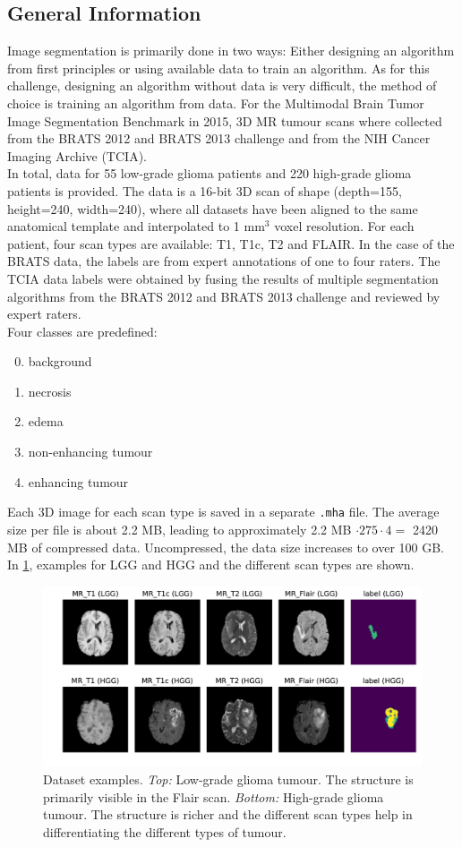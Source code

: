 \documentclass[final]{article}
\begin{document}
\subsection{General Information}
Image segmentation is primarily done in two ways: Either designing an algorithm
from first principles or using available data to train an algorithm. As for
this challenge, designing an algorithm without data is very difficult, the
method of choice is training an algorithm from data. For the Multimodal Brain
Tumor Image Segmentation Benchmark \citep{BRATS} in 2015, 3D MR tumour scans
where collected from the BRATS 2012 and BRATS 2013 challenge and from the NIH
Cancer Imaging Archive (TCIA).\\ In total, data for 55 low-grade glioma patients
and 220 high-grade glioma patients is provided. The data is a 16-bit 3D scan of
shape (depth=155, height=240, width=240), where all datasets have been aligned
to the same anatomical template and interpolated to 1 mm$^3$ voxel
resolution. For each patient, four scan types are available: T1, T1c, T2 and
FLAIR. In the case of the BRATS data, the labels are from expert annotations of
one to four raters. The TCIA data labels were obtained by fusing the results of
multiple segmentation algorithms from the BRATS 2012 and BRATS 2013 challenge
and reviewed by expert raters.\\
Four classes are predefined:
\begin{enumerate}[label=\arabic*),topsep=0pt]
  \setcounter{enumi}{-1}
\item background
\item necrosis
\item edema
\item non-enhancing tumour
\item enhancing tumour
\end{enumerate}
Each 3D image for each scan type is saved in a separate \verb+.mha+ file. The
average size per file is about 2.2 MB, leading to approximately
 2.2 MB $\cdot 275 \cdot 4 =$ 2420 MB of compressed data.
Uncompressed, the data size increases to over 100 GB. In
\cref{fig:dataex}, examples for LGG and HGG and the different scan types are
shown.

\begin{figure}[h]
\centering
\includegraphics[width=0.99\linewidth]{scan_types_both}
\caption{Dataset examples. \textit{Top:} Low-grade glioma tumour. The structure
is primarily visible in the Flair scan. \textit{Bottom:} High-grade glioma
tumour. The structure is richer and the different scan types help in
differentiating the different types of tumour.}
\label{fig:dataex}
\end{figure}
\end{document}
